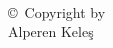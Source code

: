 
\thispagestyle{empty}
\hbox{\ }

\vfill
\renewcommand{\baselinestretch}{1}
\small\normalsize

\begin{center}
    \large{\copyright \hbox{ }Copyright by\\
        Alperen Keleş\\
        \the\year}
\end{center}

\vfill

\newpage
